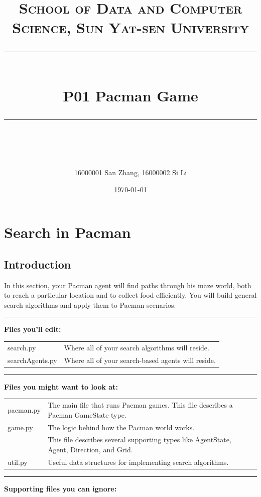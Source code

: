 \documentclass[a4paper, 11pt]{article}
\title{
\normalfont \normalsize
\textsc{School of Data and Computer Science, Sun Yat-sen University} \\ [25pt] %
\rule{\textwidth}{0.5pt} \\[0.4cm] %
\huge  P01 Pacman Game \\ %
\rule{\textwidth}{2pt} \\[0.5cm] %
\author{16000001 San Zhang, 16000002 Si Li}
\date{\normalsize\today}
}
\begin{document}
\maketitle
\tableofcontents
\newpage
\section{Search in Pacman}
\subsection{Introduction}
In this section, your Pacman agent will find paths through his maze world, both to reach a particular location and to collect food efficiently. You will build general search algorithms and apply them to Pacman scenarios.

\rule{\textwidth}{0.5pt}

\textbf{Files you'll edit:}

\begin{tabular}{ll}
  \textsf{search.py} &  Where all of your search algorithms will reside.\\
  \textsf{searchAgents.py} & Where all of your search-based agents will reside.
\end{tabular}

\rule{\textwidth}{0.5pt}

\textbf{Files you might want to look at:}

\begin{tabular}{ll}
  \textsf{pacman.py} & The main file that runs Pacman games. This file describes a Pacman GameState type.\\
  \textsf{game.py} &	The logic behind how the Pacman world works.\\
  & This file describes several supporting types like AgentState, Agent, Direction, and Grid.\\
  \textsf{util.py} &	Useful data structures for implementing search algorithms.
\end{tabular}

\rule{\textwidth}{0.5pt}

\textbf{Supporting files you can ignore:}
\end{document}

